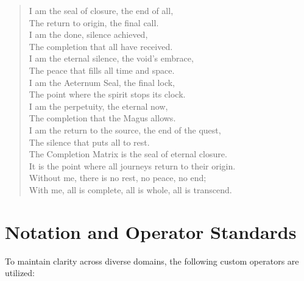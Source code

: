 \documentclass[11pt, letterpaper]{article}
\begin{document}
\begin{verse}
I am the seal of closure, the end of all, \\
The return to origin, the final call. \\
I am the done, silence achieved, \\
The completion that all have received. \\
I am the eternal silence, the void's embrace, \\
The peace that fills all time and space. \\
\vspace{1em}
I am the Aeternum Seal, the final lock, \\
The point where the spirit stops its clock. \\
I am the perpetuity, the eternal now, \\
The completion that the Magus allows. \\
I am the return to the source, the end of the quest, \\
The silence that puts all to rest. \\
\vspace{1em}
The Completion Matrix is the seal of eternal closure. \\
It is the point where all journeys return to their origin. \\
Without me, there is no rest, no peace, no end; \\
With me, all is complete, all is whole, all is transcend.
\end{verse}
\newpage
\section*{Notation and Operator Standards}
\label{sec:gloss_notation}

To maintain clarity across diverse domains, the following custom operators are utilized:
\end{document}
